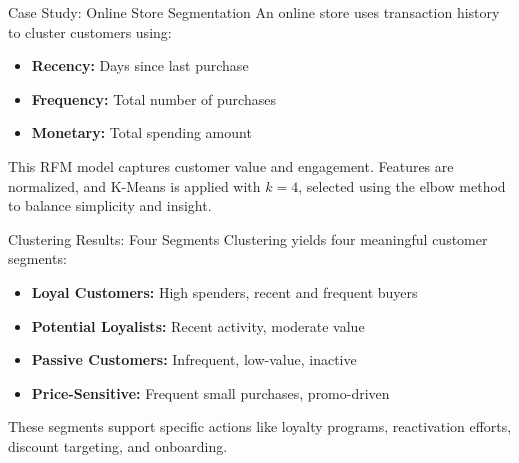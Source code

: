 \documentclass[aspectratio=169, table]{beamer}
\begin{document}
\begin{frame}{Case Study: Online Store Segmentation}
	An online store uses transaction history to cluster customers using:
	
	\begin{itemize}
		\item \textbf{Recency:} Days since last purchase
		\item \textbf{Frequency:} Total number of purchases
		\item \textbf{Monetary:} Total spending amount
	\end{itemize}
	
	This RFM model captures customer value and engagement. Features are normalized, and K-Means is applied with \(k = 4\), selected using the elbow method to balance simplicity and insight.
\end{frame}

\begin{frame}{Clustering Results: Four Segments}
	Clustering yields four meaningful customer segments:
	
	\begin{itemize}
		\item \textbf{Loyal Customers:} High spenders, recent and frequent buyers
		\item \textbf{Potential Loyalists:} Recent activity, moderate value
		\item \textbf{Passive Customers:} Infrequent, low-value, inactive
		\item \textbf{Price-Sensitive:} Frequent small purchases, promo-driven
	\end{itemize}
	
	These segments support specific actions like loyalty programs, reactivation efforts, discount targeting, and onboarding.
\end{frame}

%	
%	
\end{document}
